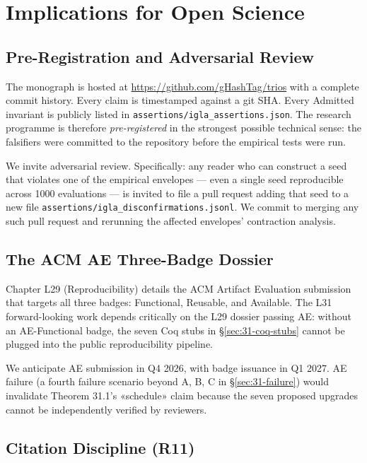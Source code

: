 \section{Implications for Open Science}
\label{sec:31-open-science}

\subsection{Pre-Registration and Adversarial Review}
\label{sec:31-prereg}

The monograph is hosted at \url{https://github.com/gHashTag/trios} with a complete commit history. Every claim is timestamped against a git SHA. Every Admitted invariant is publicly listed in \texttt{assertions/igla\_assertions.json}. The research programme is therefore \emph{pre-registered} in the strongest possible technical sense: the falsifiers were committed to the repository before the empirical tests were run.

We invite adversarial review. Specifically: any reader who can construct a seed that violates one of the empirical envelopes — even a single seed reproducible across 1000 evaluations — is invited to file a pull request adding that seed to a new file \texttt{assertions/igla\_disconfirmations.jsonl}. We commit to merging any such pull request and rerunning the affected envelopes' contraction analysis.

\subsection{The ACM AE Three-Badge Dossier}
\label{sec:31-acm-ae}

Chapter L29 (Reproducibility) details the ACM Artifact Evaluation submission that targets all three badges: Functional, Reusable, and Available. The L31 forward-looking work depends critically on the L29 dossier passing AE: without an AE-Functional badge, the seven Coq stubs in §\ref{sec:31-coq-stubs} cannot be plugged into the public reproducibility pipeline.

We anticipate AE submission in Q4 2026, with badge issuance in Q1 2027. AE failure (a fourth failure scenario beyond A, B, C in §\ref{sec:31-failure}) would invalidate Theorem 31.1's «schedule» claim because the seven proposed upgrades cannot be independently verified by reviewers.

\subsection{Citation Discipline (R11)}
\label{sec:31-citation-discipline}

